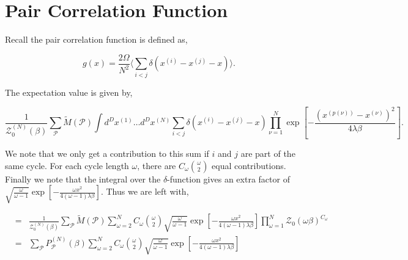 \documentclass[aps,preprint,showpacs,superscriptaddress,groupedaddress]{revtex4}  %
\begin{document}
\section{Pair Correlation Function}

Recall the pair correlation function is defined as,

\begin{equation}
  g(x) = \frac{2 \Omega}{N^{2}} \langle \sum_{i<j} \delta(x^{(i)}-x^{(j)}-x) \rangle.
\end{equation}

The expectation value is given by,

\begin{equation}
  \frac{1}{\mathcal{Z}_{0}^{(N)}(\beta)} \sum_{\mathcal{P}} \tilde{M}(\mathcal{P}) \int d^{D}x^{(1)} \dots d^{D}x^{(N)} \sum_{i<j} \delta(x^{(i)}-x^{(j)}-x) \prod_{\nu=1}^{N} \exp{[-\frac{(x^{(p(\nu))}-x^{(\nu)})^{2}}{4\lambda\beta}]}.
\end{equation}

We note that we only get a contribution to this sum if $i$ and $j$ are part of the same cycle. For each cycle length $\omega$, there are $C_{\omega} \binom{\omega}{2}$ equal contributions. Finally we note that the integral over the $\delta$-function gives an extra factor of $\sqrt{\frac{\omega}{\omega-1}}\exp{[-\frac{\omega x^{2}}{4(\omega-1)\lambda\beta}]}$. Thus we are left with,

\begin{eqnarray}
  &=& \frac{1}{\mathcal{Z}_{0}^{(N)}(\beta)} \sum_{\mathcal{P}} \tilde{M}(\mathcal{P}) \sum_{\omega=2}^{N} C_{\omega} \binom{\omega}{2} \sqrt{\frac{\omega}{\omega-1}}\exp{[-\frac{\omega x^{2}}{4(\omega-1)\lambda\beta}]} \prod_{\omega=1}^{N} \mathcal{Z}_{0}(\omega\beta)^{C_{\omega}} \\ 
  &=& \sum_{\mathcal{P}} P_{\mathcal{P}}^{(N)}(\beta) \sum_{\omega=2}^{N} C_{\omega} \binom{\omega}{2} \sqrt{\frac{\omega}{\omega-1}}\exp{[-\frac{\omega x^{2}}{4(\omega-1)\lambda\beta}]}
\end{eqnarray}

{}

%
\end{document}
